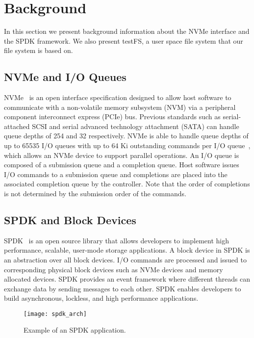 \section{Background}

In this section we present background information about the NVMe interface and
the SPDK framework. We also present testFS, a user space file system that our
file system is based on.

\subsection{NVMe and I/O Queues}

NVMe~\cite{nvme} is an open interface specification designed to allow host
software to communicate with a non-volatile memory subsystem (NVM) via a
peripheral component interconnect express (PCIe) bus. Previous standards such
as serial-attached SCSI and serial advanced technology attachment (SATA) can
handle queue depths of 254 and 32 respectively. NVMe is able to handle queue
depths of up to 65535 I/O queues with up to 64 Ki outstanding commands per I/O
queue~\cite{nvme}, which allows an NVMe device to support parallel operations.
An I/O queue is composed of a submission queue and a completion queue. Host
software issues I/O commands to a submission queue and completions are placed
into the associated completion queue by the controller. Note that the order of
completions is not determined by the submission order of the commands.

\subsection{SPDK and Block Devices}

SPDK~\cite{spdk} is an open source library that allows developers to implement
high performance, scalable, user-mode storage applications. A block device in
SPDK is an abstraction over all block devices. I/O commands are processed and
issued to corresponding physical block devices such as NVMe devices and memory
allocated devices. SPDK provides an event framework where different threads
can exchange data by sending messages to each other. SPDK enables developers to
build asynchronous, lockless, and high performance applications.

\begin{figure}
  \centering
  \texttt{[image: spdk\_arch]}
  \caption{Example of an SPDK application.}
  \label{fig:spdk_arch}
\end{figure}

